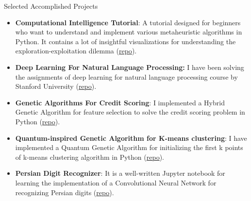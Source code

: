 \documentclass[]{mcdowellcv}
\begin{document}
        \begin{cvsection}{Selected Accomplished Projects}
    	\begin{cvsubsection}{}{}{}
        	\begin{itemize}
        	    \item \textbf{Computational Intelligence Tutorial}: A tutorial designed for beginners who want to understand and implement various metaheuristic algorithms in Python. It contains a lot of insightful visualizations for understanding the exploration-exploitation dilemma (\href{https://github.com/Computational-Intelligence-Fall18/Computational-Intelligence-Tutorials}{repo}).
        	    \item \textbf{Deep Learning For Natural Language Processing:} I have been solving the assignments of deep learning for natural language processing course by Stanford University (\href{https://github.com/erfanMhi/cs224n_Assignments}{repo}).
        	    \item \textbf{Genetic Algorithms For Credit Scoring}: I implemented a Hybrid Genetic Algorithm for feature selection to solve the credit scoring problem in Python (\href{https://github.com/erfanMhi/Genetic-algorithms-for-credit-scoring}{repo}).
        	    \item \textbf{Quantum-inspired Genetic Algorithm for K-means clustering}: I have implemented a Quantum Genetic Algorithm for initializing the first k points of k-means clustering algorithm in Python (\href{https://github.com/erfanMhi/A-quantum-inspired-genetic-algorithm-for-k-means-clustering}{repo}).
        	    \item \textbf{Persian Digit Recognizer}: It is a well-written Jupyter notebook for learning the implementation of a Convolutional Neural Network for recognizing Persian digits (\href{https://github.com/erfanMhi/Persian-Digits-Recognizer}{repo}).

\end{itemize}
\end{cvsubsection}
\end{cvsection}
\end{document}
